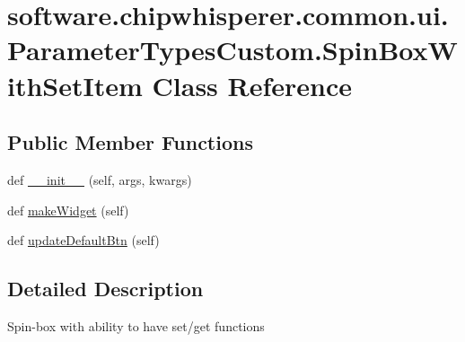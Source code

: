 \hypertarget{classsoftware_1_1chipwhisperer_1_1common_1_1ui_1_1ParameterTypesCustom_1_1SpinBoxWithSetItem}{}\section{software.\+chipwhisperer.\+common.\+ui.\+Parameter\+Types\+Custom.\+Spin\+Box\+With\+Set\+Item Class Reference}
\label{classsoftware_1_1chipwhisperer_1_1common_1_1ui_1_1ParameterTypesCustom_1_1SpinBoxWithSetItem}
\subsection*{Public Member Functions}
\begin{DoxyCompactItemize}
\item 
def \hyperlink{classsoftware_1_1chipwhisperer_1_1common_1_1ui_1_1ParameterTypesCustom_1_1SpinBoxWithSetItem_a2e969a99915f96faea99ce1e45f2513b}{\+\_\+\+\_\+init\+\_\+\+\_\+} (self, args, kwargs)
\item 
def \hyperlink{classsoftware_1_1chipwhisperer_1_1common_1_1ui_1_1ParameterTypesCustom_1_1SpinBoxWithSetItem_ad9eff24ba16471bf95bade40352073ef}{make\+Widget} (self)
\item 
def \hyperlink{classsoftware_1_1chipwhisperer_1_1common_1_1ui_1_1ParameterTypesCustom_1_1SpinBoxWithSetItem_a1cecbb40f265dd486c4baf54b2c0fb35}{update\+Default\+Btn} (self)
\end{DoxyCompactItemize}


\subsection{Detailed Description}
\begin{DoxyVerb}Spin-box with ability to have set/get functions \end{DoxyVerb}
 

